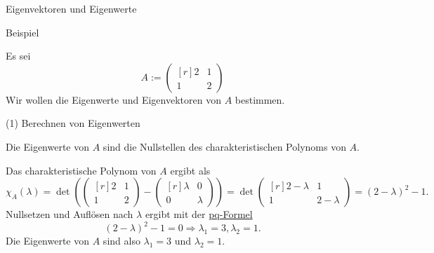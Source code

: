 \documentclass[
  8pt,
  ignorenonframetext,
]{beamer}
\begin{document}
\begin{frame}{Eigenvektoren und Eigenwerte}
\protect\hypertarget{eigenvektoren-und-eigenwerte-5}{}

Beispiel

\footnotesize

Es sei \begin{equation}
A :=
\begin{pmatrix*}[r]
2 & 1 \\
1 & 2\end{pmatrix*}
\end{equation} Wir wollen die Eigenwerte und Eigenvektoren von \(A\)
bestimmen. \vspace{1mm}

\small

\noindent (1) Berechnen von Eigenwerten \footnotesize

Die Eigenwerte von \(A\) sind die Nullstellen des charakteristischen
Polynoms von \(A\).

Das charakteristische Polynom von \(A\) ergibt als \begin{equation}
\chi_A(\lambda)
=
\det\left(
\begin{pmatrix*}[r]
2 & 1 \\
1 & 2\end{pmatrix*}
-
\begin{pmatrix*}[r]
\lambda & 0 \\
0       & \lambda
\end{pmatrix*}
\right)
=
\det
\begin{pmatrix*}[r]
2 - \lambda & 1 \\
1 & 2 - \lambda
\end{pmatrix*}
= (2 - \lambda)^2 - 1.
\end{equation} Nullsetzen und Auflösen nach \(\lambda\) ergibt mit der
\href{https://de.wikipedia.org/wiki/Quadratische_Gleichung}{pq-Formel}
\begin{equation}
(2 - \lambda)^2 - 1 = 0 \Rightarrow \lambda_1 = 3, \lambda_2 = 1.
\end{equation} Die Eigenwerte von \(A\) sind also \(\lambda_1 = 3\) und
\(\lambda_2 = 1\).
\end{frame}
\end{document}
